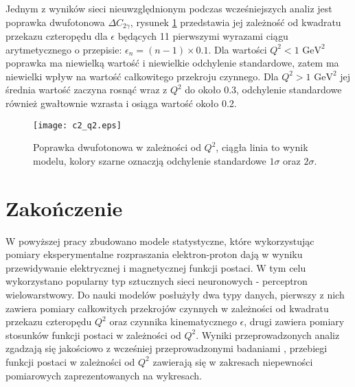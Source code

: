 \documentclass[11pt]{book}
\theoremstyle{definition}
\begin{document}
Jednym z wyników sieci nieuwzględnionym podczas wcześniejszych analiz jest poprawka dwufotonowa $\Delta C_{2\gamma}$, rysunek \ref{fig:c2} przedstawia jej zależność od kwadratu przekazu czteropędu dla $\epsilon$ będących 11 pierwszymi wyrazami ciągu arytmetycznego o przepisie: $\epsilon_n = (n-1) \times 0.1$. Dla wartości $Q^2 < 1 \text{ GeV}^2$ poprawka ma niewielką wartość i niewielkie odchylenie standardowe, zatem ma niewielki wpływ na wartość całkowitego przekroju czynnego.  Dla $Q^2 > 1 \text{ GeV}^2$ jej średnia wartość zaczyna rosnąć wraz z $Q^2$ do około 0.3, odchylenie standardowe również gwałtownie wzrasta i osiąga wartość około 0.2.



\begin{figure}[hp!]
	\centering
	\texttt{[image: c2\_q2.eps]}
	\caption{Poprawka dwufotonowa w zależności od $Q^2$, ciągła linia to wynik modelu, kolory szarne oznaczją odchylenie standardowe $1\sigma$ oraz $2\sigma$.} 
	\label{fig:c2}
\end{figure}


\chapter{Zakończenie}
\label{summary}

W powyższej pracy zbudowano modele statystyczne, które wykorzystując pomiary eksperymentalne rozpraszania elektron-proton dają w wyniku przewidywanie elektrycznej i magnetycznej funkcji postaci. W tym celu wykorzystano popularny typ sztucznych sieci neuronowych - perceptron wielowarstwowy. Do nauki modelów posłużyły dwa typy danych, pierwszy z nich zawiera pomiary całkowitych przekrojów czynnych w zależności od kwadratu przekazu czteropędu $Q^2$ oraz czynnika kinematycznego $\epsilon$, drugi zawiera pomiary stosunków funkcji postaci w zależności od $Q^2$. Wyniki przeprowadzonych analiz zgadzają się jakościowo z wcześniej przeprowadzonymi badaniami \cite{2009PhRvC..79f5204A}, przebiegi funkcji postaci w zależności od $Q^2$ zawierają się w zakresach niepewności pomiarowych zaprezentowanych na wykresach.
\end{document}
